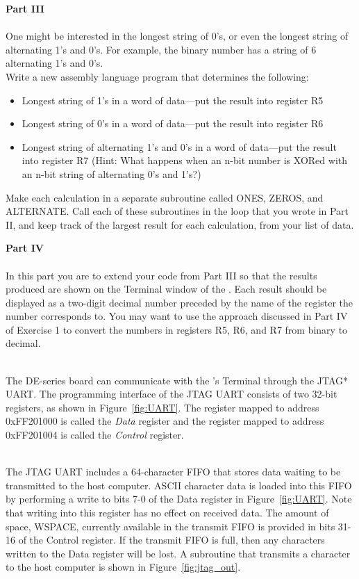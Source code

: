\documentclass[epsfig,10pt,fullpage]{article}
\begin{document}
\noindent
{\bf Part III}
~\\
~\\
\noindent
One might be interested in the longest string of 0's, or even the longest string of
alternating 1's and 0's. For example, the binary number {} has a string of 
6 alternating 1's and 0's.
~\\

\noindent Write a new assembly language program that determines the following:
\begin{itemize}
\item Longest string of 1's in a word of data---put the result into register R5
\item Longest string of 0's in a word of data---put the result into register R6
\item Longest string of alternating 1's and 0's in a word of data---put the result into 
register R7
(Hint: What happens when an n-bit number is XORed with an n-bit string of alternating 0's and 1's?)
\end{itemize}
Make each calculation in a separate subroutine called ONES, ZEROS, and ALTERNATE. Call
each of these subroutines in the loop that you wrote in Part II, and keep track of the
largest result for each calculation, from your list of data.

\newpage
\noindent
{\bf Part IV}
~\\
~\\
\noindent
In this part you are to extend your code from Part III so that the results produced are
shown on the Terminal window of the \productNameMedTM{}.
Each result should be displayed as a two-digit decimal number preceded by the name of the register
the number corresponds to. You may want to use the approach discussed in Part IV of Exercise 1 to
convert the numbers in registers R5, R6, and R7 from binary to decimal.  

~\\
\noindent
The DE-series board can communicate with the \productNameMed{}'s Terminal through the 
JTAG* UART.  The programming interface of the JTAG UART consists of two 32-bit registers, as
shown in Figure~\ref{fig:UART}. The register mapped to address 0xFF201000 is called the 
{\it Data} register and the register mapped to address 0xFF201004 is called the {\it
Control} register.

~\\
\noindent
The JTAG UART includes a 64-character FIFO that stores data waiting to be transmitted to the 
host computer.  ASCII character data is loaded into this FIFO by performing a write to 
bits 7-0 of the Data register in Figure~\ref{fig:UART}. Note that writing into this register 
has no effect on received data. The amount of space, WSPACE, currently available in
the transmit FIFO is provided in bits 31-16 of the Control register. If the transmit FIFO 
is full, then any characters written to the Data register will be lost. A subroutine that 
transmits a character to the host computer is shown in Figure~\ref{fig:jtag_out}.
\end{document}
